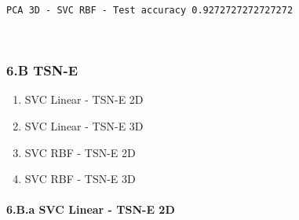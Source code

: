 \documentclass[11pt]{article}
\providecommand{\tightlist}{%
      \setlength{\itemsep}{0pt}\setlength{\parskip}{0pt}}
\begin{document}
    \begin{Verbatim}[commandchars=\\\{\}]
PCA 3D - SVC RBF - Test accuracy 0.9272727272727272

    \end{Verbatim}

    \begin{center}
    \end{center}
    { \hspace*{\fill} \\}
    
    \hypertarget{b-tsn-e}{%
\subsubsection{6.B TSN-E}\label{b-tsn-e}}

\begin{enumerate}
\def\labelenumi{\arabic{enumi}.}
\tightlist
\item
  SVC Linear - TSN-E 2D
\item
  SVC Linear - TSN-E 3D
\item
  SVC RBF - TSN-E 2D
\item
  SVC RBF - TSN-E 3D
\end{enumerate}

    \hypertarget{b.a-svc-linear---tsn-e-2d}{%
\paragraph{6.B.a SVC Linear - TSN-E
2D}\label{b.a-svc-linear---tsn-e-2d}}
\end{document}
